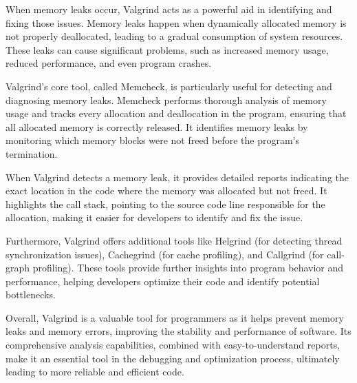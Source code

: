 \documentclass[12pt]{article}
\begin{document}
When memory leaks occur, Valgrind acts as a powerful aid in identifying and fixing those issues. Memory leaks happen when dynamically allocated memory is not properly deallocated, leading to a gradual consumption of system resources. These leaks can cause significant problems, such as increased memory usage, reduced performance, and even program crashes.



Valgrind's core tool, called Memcheck, is particularly useful for detecting and diagnosing memory leaks. Memcheck performs thorough analysis of memory usage and tracks every allocation and deallocation in the program, ensuring that all allocated memory is correctly released. It identifies memory leaks by monitoring which memory blocks were not freed before the program's termination.



When Valgrind detects a memory leak, it provides detailed reports indicating the exact location in the code where the memory was allocated but not freed. It highlights the call stack, pointing to the source code line responsible for the allocation, making it easier for developers to identify and fix the issue.



Furthermore, Valgrind offers additional tools like Helgrind (for detecting thread synchronization issues), Cachegrind (for cache profiling), and Callgrind (for call-graph profiling). These tools provide further insights into program behavior and performance, helping developers optimize their code and identify potential bottlenecks.



Overall, Valgrind is a valuable tool for programmers as it helps prevent memory leaks and memory errors, improving the stability and performance of software. Its comprehensive analysis capabilities, combined with easy-to-understand reports, make it an essential tool in the debugging and optimization process, ultimately leading to more reliable and efficient code.
\end{document}
